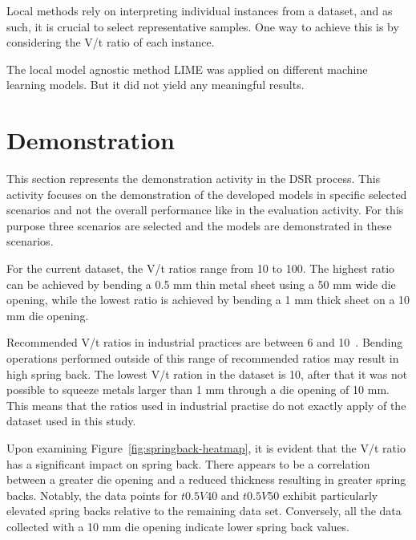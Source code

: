 Local methods rely on interpreting individual instances from a dataset, and as such, it is
crucial to select representative samples.
One way to achieve this is by considering the V/t ratio of each instance.

The local model agnostic method LIME was applied on different machine learning models.
But it did not yield any meaningful results.


\section{Demonstration}\label{sec:demonstration}
This section represents the demonstration activity in the \ac{DSR} process.
This activity focuses on the demonstration of the developed models in specific selected scenarios and not the
overall performance like in the evaluation activity.
For this purpose three scenarios are selected and the models are demonstrated in these scenarios.

For the current dataset, the V/t ratios range from 10 to 100.
The highest ratio can be achieved by bending a 0.5 mm thin metal sheet using a 50 mm wide die opening, while the
lowest ratio is achieved by bending a 1 mm thick sheet on a 10 mm die opening.

Recommended V/t ratios in industrial practices are between 6 and 10~\cite[p.7]{cruz_applicationmachinelearning_2021}.
Bending operations performed outside of this range of recommended ratios may result in
high spring back.
The lowest V/t ration in the dataset is 10, after that it was not possible to squeeze metals larger than 1 mm
through a die opening of 10 mm.
This means that the ratios used in industrial practise do not exactly apply of the dataset used in this study.

Upon examining Figure~\ref{fig:springback-heatmap}, it is evident that the V/t ratio has a significant impact on
spring back.
There appears to be a correlation between a greater die opening and a reduced thickness resulting in greater spring
backs.
Notably, the data points for $t0.5 V40$ and $t0.5 V50$ exhibit particularly elevated spring backs relative to the
remaining data set.
Conversely, all the data collected with a 10 mm die opening indicate lower spring back values.

